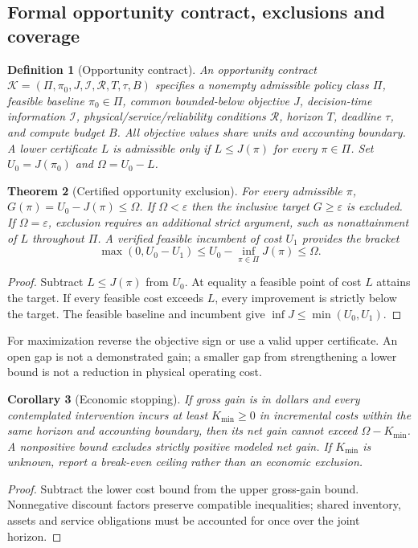 \documentclass[11pt,letterpaper]{article}
\newtheorem{coathm}{Theorem}[section]
\newtheorem{coadef}[coathm]{Definition}
\newtheorem{coacor}[coathm]{Corollary}
\begin{document}
\subsection{Formal opportunity contract, exclusions and coverage}
\label{sec:coaformal}
\begin{coadef}[Opportunity contract]
An opportunity contract $\mathcal K=(\Pi,\pi_0,J,\mathcal I,\mathcal R,T,\tau,B)$ specifies a nonempty admissible policy class $\Pi$, feasible baseline $\pi_0\in\Pi$, common bounded-below objective $J$, decision-time information $\mathcal I$, physical/service/reliability conditions $\mathcal R$, horizon $T$, deadline $\tau$, and compute budget $B$. All objective values share units and accounting boundary. A lower certificate $L$ is admissible only if $L\le J(\pi)$ for every $\pi\in\Pi$. Set $U_0=J(\pi_0)$ and $\Omega=U_0-L$.
\end{coadef}
\begin{coathm}[Certified opportunity exclusion]
\label{thm:coaexclude}
For every admissible $\pi$, $G(\pi)=U_0-J(\pi)\le\Omega$. If $\Omega<\varepsilon$ then the inclusive target $G\ge\varepsilon$ is excluded. If $\Omega=\varepsilon$, exclusion requires an additional strict argument, such as nonattainment of $L$ throughout $\Pi$. A verified feasible incumbent of cost $U_1$ provides the bracket
\[
 \max(0,U_0-U_1)\le U_0-\inf_{\pi\in\Pi}J(\pi)\le\Omega .
\]
\end{coathm}
\begin{proof}
Subtract $L\le J(\pi)$ from $U_0$. At equality a feasible point of cost $L$ attains the target. If every feasible cost exceeds $L$, every improvement is strictly below the target. The feasible baseline and incumbent give $\inf J\le\min(U_0,U_1)$.
\end{proof}
For maximization reverse the objective sign or use a valid upper certificate. An open gap is not a demonstrated gain; a smaller gap from strengthening a lower bound is not a reduction in physical operating cost.
\begin{coacor}[Economic stopping]
If gross gain is in dollars and every contemplated intervention incurs at least $K_{\min}\ge0$ in incremental costs within the same horizon and accounting boundary, then its net gain cannot exceed $\Omega-K_{\min}$. A nonpositive bound excludes strictly positive modeled net gain. If $K_{\min}$ is unknown, report a break-even ceiling rather than an economic exclusion.
\end{coacor}
\begin{proof}Subtract the lower cost bound from the upper gross-gain bound. Nonnegative discount factors preserve compatible inequalities; shared inventory, assets and service obligations must be accounted for once over the joint horizon.\end{proof}
\end{document}
